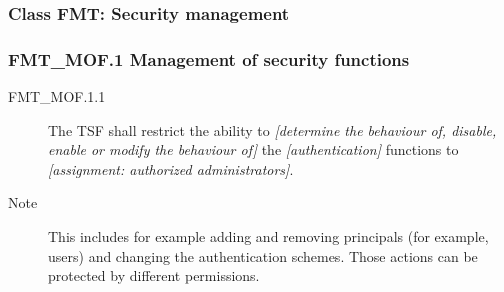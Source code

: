\documentclass[10pt,a4paper,english]{article}
\begin{document}
\hypertarget{class-fmt-security-management}{}
\subsubsection*{Class FMT: Security management}



\hypertarget{fmt-mof-1-management-of-security-functions}{}
\subsubsection*{FMT{\_}MOF.1 Management of security functions}
\begin{description}
\item[FMT{\_}MOF.1.1]

The TSF shall restrict the ability to \emph{{[}determine the
behaviour of, disable, enable or modify the behaviour of]} the
\emph{{[}authentication]} functions to \emph{{[}assignment: 
authorized administrators]}.

\item[Note]

This includes for example adding and removing principals (for example,
users) and changing the authentication schemes. Those actions can be
protected by different permissions.

\end{description}



\hypertarget{fmt-msa-1-management-of-security-attributes}{}
\end{document}

